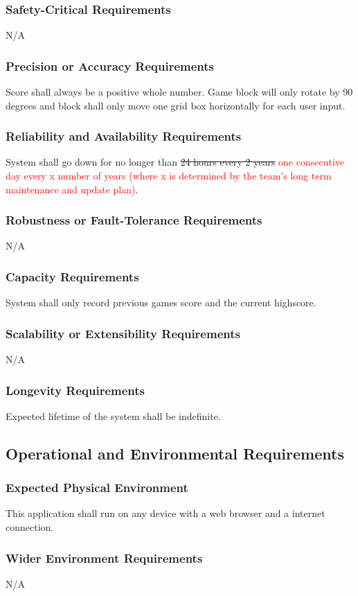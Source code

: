 \documentclass[12pt, titlepage]{article}
\begin{document}
\subsubsection{Safety-Critical Requirements}
N/A
\subsubsection{Precision or Accuracy Requirements}
Score shall always be a positive whole number. Game block will only rotate by 90 degrees and block shall only move one grid box horizontally for each user input.
\subsubsection{Reliability and Availability Requirements}
System shall go down for no longer than \sout{24 hours every 2 years} \textcolor{red}{one consecutive day every x number of years (where x is determined by the team's long term maintenance and update plan)}.
\subsubsection{Robustness or Fault-Tolerance Requirements}
N/A
\subsubsection{Capacity Requirements}
System shall only record previous games score and the current highscore.
\subsubsection{Scalability or Extensibility Requirements}
N/A
\subsubsection{Longevity Requirements}
Expected lifetime of the system shall be indefinite.

\subsection{Operational and Environmental Requirements}
\subsubsection{Expected Physical Environment}
This application shall run on any device with a web browser and a internet connection.
\subsubsection{Wider Environment Requirements}
N/A
\end{document}
